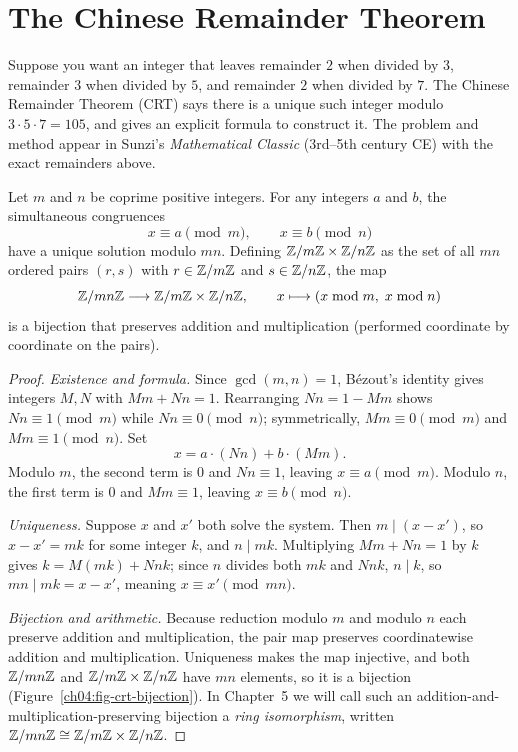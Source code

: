 \section{The Chinese Remainder Theorem}
\label{ch04:crt}

Suppose you want an integer that leaves remainder $2$ when divided by $3$, remainder $3$ when
divided by $5$, and remainder $2$ when divided by $7$. The Chinese Remainder Theorem (CRT) says
there is a unique such integer modulo $3 \cdot 5 \cdot 7 = 105$, and gives an explicit formula to
construct it. The problem and method appear in Sunzi's \emph{Mathematical Classic} (3rd--5th century
CE) with the exact remainders above.

\begin{theorem}
\label{ch04:thm-crt}
Let $m$ and $n$ be coprime positive integers. For any integers $a$ and $b$, the simultaneous
congruences
\[
  x \equiv a \pmod m, \qquad x \equiv b \pmod n
\]
have a unique solution modulo $mn$. Defining $\mathbb{Z}/m\mathbb{Z} \times \mathbb{Z}/n\mathbb{Z}$ as the set of all $mn$ ordered
pairs $(r, s)$ with $r \in \mathbb{Z}/m\mathbb{Z}$ and $s \in \mathbb{Z}/n\mathbb{Z}$, the map
\[
  \mathbb{Z}/mn\mathbb{Z} \longrightarrow \mathbb{Z}/m\mathbb{Z} \times \mathbb{Z}/n\mathbb{Z}, \qquad
  x \longmapsto (x \bmod m,\; x \bmod n)
\]
is a bijection that preserves addition and multiplication (performed coordinate by coordinate on the
pairs).
\end{theorem}

\begin{proof}
\emph{Existence and formula.} Since $\gcd(m, n) = 1$, B\'ezout's identity gives integers $M, N$ with
$M m + N n = 1$. Rearranging $N n = 1 - M m$ shows $N n \equiv 1 \pmod m$ while
$N n \equiv 0 \pmod n$; symmetrically, $M m \equiv 0 \pmod m$ and $M m \equiv 1 \pmod n$. Set
\[
  x = a \cdot (Nn) + b \cdot (Mm).
\]
Modulo $m$, the second term is $0$ and $Nn \equiv 1$, leaving $x \equiv a \pmod m$. Modulo $n$, the
first term is $0$ and $Mm \equiv 1$, leaving $x \equiv b \pmod n$.

\emph{Uniqueness.} Suppose $x$ and $x'$ both solve the system. Then $m \mid (x - x')$, so
$x - x' = mk$ for some integer $k$, and $n \mid mk$. Multiplying $Mm + Nn = 1$ by $k$ gives
$k = M(mk) + Nnk$; since $n$ divides both $mk$ and $Nnk$, $n \mid k$, so $mn \mid mk = x - x'$,
meaning $x \equiv x' \pmod{mn}$.

\emph{Bijection and arithmetic.} Because reduction modulo $m$ and modulo $n$ each preserve addition
and multiplication, the pair map preserves coordinatewise addition and multiplication. Uniqueness
makes the map injective, and both $\mathbb{Z}/mn\mathbb{Z}$ and $\mathbb{Z}/m\mathbb{Z} \times \mathbb{Z}/n\mathbb{Z}$ have $mn$ elements, so it is
a bijection (Figure~\ref{ch04:fig-crt-bijection}). In Chapter~5 we will call such an
addition-and-multiplication-preserving bijection a \emph{ring isomorphism}, written
$\mathbb{Z}/mn\mathbb{Z} \cong \mathbb{Z}/m\mathbb{Z} \times \mathbb{Z}/n\mathbb{Z}$.
\end{proof}

